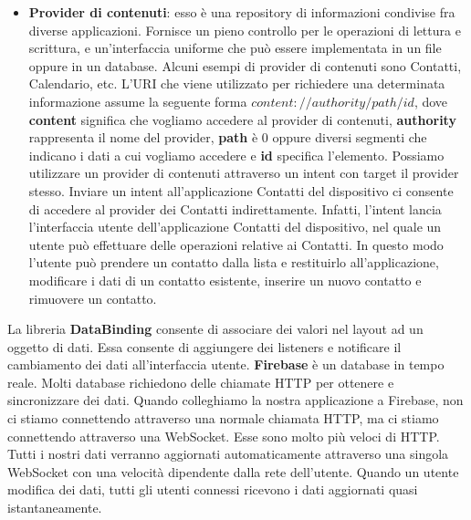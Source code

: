 \begin{itemize}
    \item \textbf{Provider di contenuti}: esso è una repository di informazioni condivise fra diverse applicazioni. Fornisce un pieno controllo per le operazioni di lettura e scrittura, e un'interfaccia uniforme che può essere implementata in un file oppure in un database. Alcuni esempi di provider di contenuti sono Contatti, Calendario, etc. L'URI che viene utilizzato per richiedere una determinata informazione assume la seguente forma $content://authority/path/id$, dove \textbf{content} significa che vogliamo accedere al provider di contenuti, \textbf{authority} rappresenta il nome del provider, \textbf{path} è 0 oppure diversi segmenti che indicano i dati a cui vogliamo accedere e \textbf{id} specifica l'elemento. Possiamo utilizzare un provider di contenuti attraverso un intent con target il provider stesso. Inviare un intent all'applicazione Contatti del dispositivo ci consente di accedere al provider dei Contatti indirettamente. Infatti, l'intent lancia l'interfaccia utente dell'applicazione Contatti del dispositivo, nel quale un utente può effettuare delle operazioni relative ai Contatti. In questo modo l'utente può prendere un contatto dalla lista e restituirlo all'applicazione, modificare i dati di un contatto esistente, inserire un nuovo contatto e rimuovere un contatto.
\end{itemize}

La libreria \textbf{DataBinding} consente di associare dei valori nel layout ad un oggetto di dati. Essa consente di aggiungere dei listeners e notificare il cambiamento dei dati all'interfaccia utente. \textbf{Firebase} è un database in tempo reale. Molti database richiedono delle chiamate HTTP per ottenere e sincronizzare dei dati. Quando colleghiamo la nostra applicazione a Firebase, non ci stiamo connettendo attraverso una normale chiamata HTTP, ma ci stiamo connettendo attraverso una WebSocket. Esse sono molto più veloci di HTTP. Tutti i nostri dati verranno aggiornati automaticamente attraverso una singola WebSocket con una velocità dipendente dalla rete dell'utente. Quando un utente modifica dei dati, tutti gli utenti connessi ricevono i dati aggiornati quasi istantaneamente.

